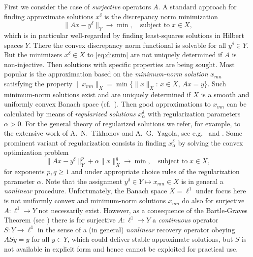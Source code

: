 \documentclass[12pt,twoside,reqno]{amsart}
\theoremstyle{definition}
\numberwithin{equation}{section}
\begin{document}
First we consider the case of \emph{surjective} operators $A$. A standard approach for finding approximate solutions $x^\delta$ is the discrepancy norm minimization
\begin{equation} \label{eq:dismin}
 \|Ax-y^\delta\|_Y \to \min, \quad \mbox{subject to} \; x \in X,
\end{equation}
which is in particular well-regarded by finding least-squares solutions in Hilbert spaces $Y$. There the convex discrepancy norm functional is solvable for all $y^\delta \in Y$. But the minimizers $x^\delta \in X$ to \eqref{eq:dismin} are not uniquely determined if $A$ is non-injective.
Then solutions with specific properties  are being sought. Most popular is the approximation based on the \emph{minimum-norm solution} $x_{mn}$ satisfying the property  $\|x_{mn}\|_X = \min \{\|x\|_X:\, x \in X,\, Ax=y\}$. Such minimum-norm solutions exist and are uniquely determined if $X$ is a smooth and uniformly convex Banach space (cf.~\cite[Lemma~3.3]{Schusterbuch12}). Then good approximations to $x_{mn}$ can be calculated by means of \emph{regularized solutions} $x_\alpha^\delta$ with regularization parameters $\alpha>0$. For the general theory of regularized solutions we refer, for example, to the extensive work of A.~N.~Tikhonov and A.~G.~Yagola, see e.g.~\cite{TikLeoYag98} and \cite{YaKo13}. Some prominent variant of regularization consists in finding $x_\alpha^\delta$ by solving the convex optimization problem
\begin{equation} \label{eq:regmin}
 \|Ax-y^\delta\|^p_Y+\alpha \|x\|^q_X \to \min, \quad \mbox{subject to} \; x \in X,
\end{equation}
for exponents $p,q \ge 1$ and under appropriate choice rules of the regularization parameter $\alpha$. Note that the assignment $y^\delta \in Y \mapsto x_{mn} \in X$ is in general a \emph{nonlinear} procedure.
Unfortunately, the Banach space $X=\ell^1$ under focus here is not uniformly convex and minimum-norm solutions $x_{mn}$ do also for surjective $A:\ell^1 \to Y$ not necessarily exist.
However, as a consequence of the Bartle-Graves Theorem (see \cite[Cor.~5J.4, p.~345]{DoRo14}) there is for surjective $A: \ell^1 \to Y$ a \emph{continuous} operator $S:Y \to \ell^1$
in the sense of a (in general) \emph{nonlinear} recovery operator obeying $ASy=y$ for all $y \in Y$, which could deliver stable approximate solutions, but $S$ is not available in explicit form and hence cannot be exploited for practical use.
\end{document}
